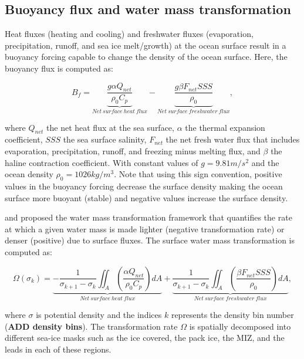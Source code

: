 \documentclass[lineno,sn-basic]{sn-jnl}%
\begin{document}
\subsection*{Buoyancy flux and water mass transformation}
 
Heat fluxes (heating and cooling) and freshwater fluxes (evaporation, precipitation, runoff, and sea ice melt/growth) at the ocean surface result in a buoyancy forcing capable to change the density of the ocean surface. Here, the buoyancy flux is computed as:

\begin{equation}
    B_f = \underbrace{\frac{g \alpha Q_{net}}{\rho_0 C_p}}_{Net\ surface\ heat\ flux} - \underbrace{\frac{g \beta F_{net} SSS }{\rho_0}}_{Net\ surface\ freshwater\ flux},
\end{equation}

where $Q_{net}$ the net heat flux at the sea surface, $\alpha$ the thermal expansion coefficient, $SSS$ the sea surface salinity, $F_{net}$ the net fresh water flux that includes evaporation, precipitation, runoff, and freezing minus melting flux, and $\beta$ the haline contraction coefficient. With constant values of $g = 9.81 m/s^2$ and the ocean density $\rho_0 = 1026 kg/m^3$. 
Note that using this sign convention, positive values in the buoyancy forcing decrease the surface density making the ocean surface more buoyant (stable) and negative values increase the surface density. 

\citet{Nurser_WMT_1999} and  \citet{Walin_WMT_1982} proposed the water mass transformation framework that quantifies the rate at which a given water mass is made lighter (negative transformation rate) or denser (positive) due to surface fluxes. The surface water mass transformation is computed as:

\begin{equation}
    \Omega(\sigma_k) = \underbrace{- \frac{1}{\sigma_{k+1}-\sigma_k}\iint_A\left(\frac{\alpha Q_{net}}{\rho_0 C_p}\right)dA}_{Net\ surface\ heat\ flux} + \underbrace{\frac{1}{\sigma_{k+1}-\sigma_k}\iint_A\left(\frac{\beta F_{net} SSS }{\rho_0}\right)dA}_{Net\ surface\ freshwater\ flux},
\end{equation}

where $\sigma$ is potential density and the indices $k$ represents the density bin number (\textbf{ADD density bins}). The transformation rate $\Omega$ is spatially decomposed into different sea-ice masks such as the ice covered, the pack ice, the MIZ, and the leads in each of these regions. 
\end{document}
